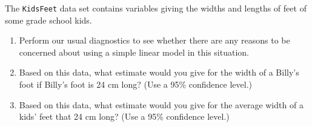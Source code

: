 \documentclass[twoside]{book}
\newcommand{\Rindex}[1]{\index{\texttt{#1}}}
\newcommand{\dataframe}[1]{{\color{blue!80!black}\texttt{#1}}\Rindex{#1}}
\begin{document}
\begin{problem}
	The \dataframe{KidsFeet} data set contains variables giving the widths and lengths
	of feet of some grade school kids.
	\begin{enumerate}
		\item
			Perform our usual diagnostics to see whether there are any reasons
			to be concerned about using a simple linear model in this situation.
		\item Based on this data, what estimate would you give for the width of a 
			Billy's foot if Billy's foot is 24 cm long?  
			(Use a 95\% confidence level.)
		\item Based on this data, what estimate would you give for the average width of a 
			kids' feet that 24 cm long?
			(Use a 95\% confidence level.)
	\end{enumerate}
\end{problem}
\end{document}
